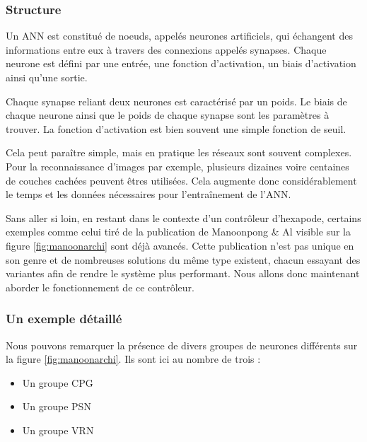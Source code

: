 \documentclass{tnreport}
\begin{document}
\subsubsection{Structure}
Un ANN est constitué de noeuds, appelés neurones artificiels, qui échangent des informations entre eux à travers des connexions appelés synapses. Chaque neurone est défini par une entrée, une fonction d'activation, un biais d'activation ainsi qu'une sortie. 

Chaque synapse reliant deux neurones est caractérisé par un poids. Le biais de chaque neurone ainsi que le poids de chaque synapse sont les paramètres à trouver. La fonction d'activation est bien souvent une simple fonction de seuil. 

Cela peut paraître simple, mais en pratique les réseaux sont souvent complexes. Pour la reconnaissance d'images par exemple, plusieurs dizaines voire centaines de couches cachées peuvent êtres utilisées. Cela augmente donc considérablement le temps et les données nécessaires pour l'entraînement de l'ANN. 

Sans aller si loin, en restant dans le contexte d'un contrôleur d'hexapode, certains exemples comme celui tiré de la publication de Manoonpong \& Al\cite{manoonpong_sensor-driven_2008} visible sur la figure \ref{fig:manoonarchi} sont déjà avancés. Cette publication n'est pas unique en son genre et de nombreuses solutions du même type existent, chacun essayant des variantes afin de rendre le système plus performant. Nous allons donc maintenant aborder le fonctionnement de ce contrôleur.

\subsubsection{Un exemple détaillé}
Nous pouvons remarquer la présence de divers groupes de neurones différents sur la figure \ref{fig:manoonarchi}. Ils sont ici au nombre de trois :
\begin{itemize}
    \item Un groupe \gls{CPG}
    \item Un groupe \gls{PSN}
    \item Un groupe \gls{VRN}
\end{itemize}
\end{document}
